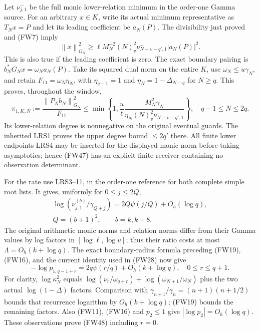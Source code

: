 \documentclass[11pt]{article}
\newcommand{\norm}[1]{\left\lVert#1\right\rVert}
\begin{document}
Let $\nu^-_{j,1}$ be the full monic lower-relation minimum in the
order-one Gamma source. For an arbitrary $x\in K$, write its actual
minimum representative as $T_Nx=P$ and let its leading coefficient be
$a_N(P)$. The divisibility just proved and (FW7) imply
\[
 \norm x_{G_N}^2\ge\ell M_N^{-2}(N)_v^2
                 \nu^-_{N-v-q',1}|a_N(P)|^2.
\]
This is also true if the leading coefficient is zero. The exact boundary
pairing is $b_N^*G_Nx=\omega_Na_N(P)$.
Take its squared dual norm on the entire $K$, use
$\omega_N\le u\gamma_N$, and retain
$F_{11}=\omega_N\eta_N$, with $\eta_{q-1}=1$ and
$\eta_N=1-\Delta_{N-q}$ for $N\ge q$. This proves, throughout the window,
\begin{equation}\tag{FW47}
 \pi_{1,K,N}:=\frac{\norm{P_Nb_N}_{G_N}^2}{F_{11}}
 \le\min\left\{1,\frac{u}{\ell}
 \frac{M_N^2\gamma_N}{\eta_N(N)_v^2\nu^-_{N-v-q',1}}\right\},
 \quad q-1\le N\le2q.
\end{equation}
Its lower-relation degree is nonnegative on the original eventual guards.
The inherited LRS1 proves the upper degree bound $\le2q'$ there.
All finite lower endpoints LRS4 may be inserted for the displayed monic
norm before taking asymptotics; hence (FW47) has an explicit finite
receiver containing no observation determinant.

For the rate use LRS3--11, in the order-one reference for both complete
simple root lists. It gives, uniformly for $0\le j\le2Q$,
\[
 \begin{gathered}
 \log(\nu_{j,1}^{(b)}/\gamma_{Q+j})=2Q\psi(j/Q)+O_h(\log q),\\
 Q=(b+1)^2,\qquad b=k,k-8.
 \end{gathered}
\]
The original arithmetic monic norms and relation norms differ from their
Gamma values by log factors in $[\log\ell,\log u]$; thus their ratio
costs at most $\Lambda=O_h(k+\log q)$. The exact boundary-radius formula
preceding (FW19), (FW16), and the current identity used in (FW28) now give
\begin{equation}\tag{FW48}
 -\log p_{1,q-1+r}=2q\psi(r/q)+O_h(k+\log q),
 \quad 0\le r\le q+1.
\end{equation}
For clarity, $\log\kappa_N^2$ equals
$\log(\nu_r/\omega_{q+r})+\log(\omega_{N+1}/\omega_N)$ plus the
two actual $\log(1-\Delta)$ factors. Comparison with
$\gamma_{n+1}/\gamma_n=(n+1)(n+1/2)$ bounds that recurrence logarithm
by $O_h(k+\log q)$; (FW19) bounds the remaining factors. Also (FW11),
(FW16) and $p_2\le1$ give $|\log p_2|=O_h(\log q)$.
These observations prove (FW48) including $r=0$.
\end{document}
